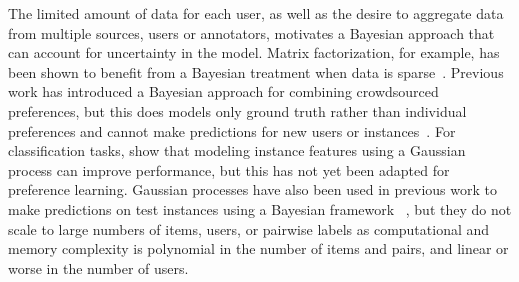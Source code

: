 The limited amount of data for each user,
as well as the desire to aggregate data from multiple sources, users or annotators,
motivates a Bayesian approach that can account for uncertainty in the model.
Matrix factorization, for example, has been shown to benefit from a Bayesian treatment when data is sparse~\citep{salakhutdinov2008bayesian}. 
Previous work has introduced a Bayesian approach for combining crowdsourced preferences, but this does models only ground truth rather than individual preferences and cannot make predictions for new users or instances~\citep{chen2013pairwise}.
For classification tasks, \citet{simpson2017bayesian} show that modeling instance features using a Gaussian process can improve performance, but this has not yet been adapted for preference learning.
Gaussian processes have also been used in previous work to make predictions on test instances using a Bayesian framework
~\citep{chu2005preference,houlsby2012collaborative,khan2014scalable}, 
but they do not scale to large numbers of items, users, or
pairwise labels as computational and memory complexity is polynomial in the number
of items and pairs, and linear or worse in the number of users.

